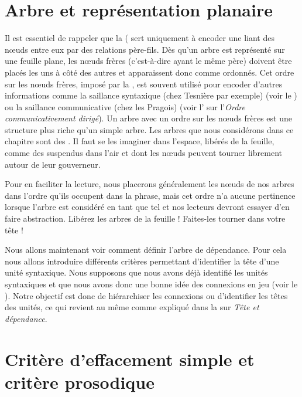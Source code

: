 \section{Arbre et représentation planaire}\label{sec:3.3.6}%

Il est essentiel de rappeler que la  ( sert uniquement à encoder une  liant des nœuds entre eux par des relations père-fils. Dès qu’un arbre est représenté sur une feuille plane, les nœuds frères (c’est-à-dire ayant le même père) doivent être placés les uns à côté des autres et apparaissent donc comme ordonnés. Cet ordre sur les nœuds frères, imposé par la , est souvent utilisé pour encoder d'autres informations comme la saillance syntaxique (chez Tesnière par exemple) (voir le ) ou la saillance communicative (chez les Pragois) (voir l' sur l'\textit{Ordre communicativement dirigé}). Un arbre avec un ordre sur les nœuds frères est une structure plus riche qu’un simple arbre. Les arbres que nous considérons dans ce chapitre sont des . Il faut se les imaginer dans l’espace, libérés de la feuille, comme des  suspendus dans l’air et dont les nœuds peuvent tourner librement autour de leur gouverneur.

Pour en faciliter la lecture, nous placerons généralement les nœuds de nos arbres dans l’ordre qu’ils occupent dans la phrase, mais cet ordre n’a aucune pertinence lorsque l’arbre est considéré en tant que tel et nos lecteurs devront essayer d’en faire abstraction. Libérez les arbres de la feuille ! Faites-les tourner dans votre tête !

Nous allons maintenant voir comment définir l’arbre de dépendance. Pour cela nous allons introduire différents critères permettant d’identifier la tête d’une unité syntaxique. Nous supposons que nous avons déjà identifié les unités syntaxiques et que nous avons donc une bonne idée des connexions en jeu (voir le ). Notre objectif est donc de hiérarchiser les connexions ou d'identifier les têtes des unités, ce qui revient au même comme expliqué dans la  sur \textit{Tête et dépendance}.

\section{Critère d’effacement simple et critère prosodique}\label{sec:3.3.7}

